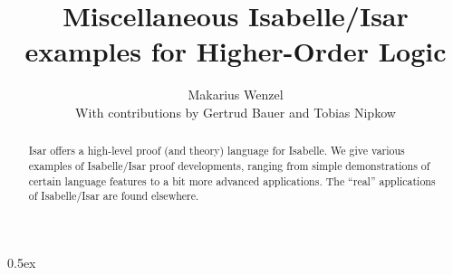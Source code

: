 \documentclass[11pt,a4paper]{article}
\begin{document}
\title{Miscellaneous Isabelle/Isar examples for Higher-Order Logic}
\author{Makarius Wenzel \\[2ex]
  With contributions by Gertrud Bauer and Tobias Nipkow}
\maketitle

\begin{abstract}
  Isar offers a high-level proof (and theory) language for Isabelle.
  We give various examples of Isabelle/Isar proof developments,
  ranging from simple demonstrations of certain language features to a
  bit more advanced applications.  The ``real'' applications of
  Isabelle/Isar are found elsewhere.
\end{abstract}

\tableofcontents

\parindent 0pt \parskip 0.5ex



\nocite{isabelle-isar-ref,Wenzel:1999:TPHOL}


\end{document}
